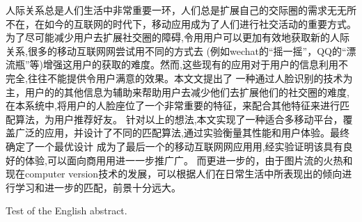 
\begin{cabstract}
	人际关系总是人们生活中非常重要一环，⼈们总是扩展自己的交际圈的需求⽆无所不在，在如今的互联网的时代下，移动应用成为了人们进行社交活动的重要方式。为了尽可能减少用户去扩展社交圈的障碍,令⽤用户可以更加有效地获取新的人际关系,很多的移动互联⽹网尝试用不同的方式去 (例如wechat的“摇一摇”，QQ的“漂流瓶”等)增强这用户的获取的难度。然⽽,这些现有的应用对于用户的信息利用不完全,往往不能提供令用户满意的效果。本⽂文提出了 ⼀种通过人脸识别的技术为主，用户的的其他信息为辅助来帮助用户去减少他们去扩展他们的社交圈的难度,在本系统中,将用户的人脸座位了一个非常重要的特征，来配合其他特征来进行匹配算法，为用户推荐好友。 
针对以上的想法,本⽂实现了一种适合多移动平台，覆盖广泛的应用，并设计了不同的匹配算法,通过实验衡量其性能和用户体验。最终确定了一个最优设计 成为了最后一个的移动互联⽹网应⽤用,经实验证明该具有良好的体验,可以面向商⽤用进⼀一步推⼴广。
而更进一步的，由于图片流的火热和现在computer version技术的发展，可以根据人们在日常生活中所表现出的倾向进行学习和进一步的匹配，前景十分远大。


\end{cabstract}

\begin{eabstract}
	Test of the English abstract.
\end{eabstract}

